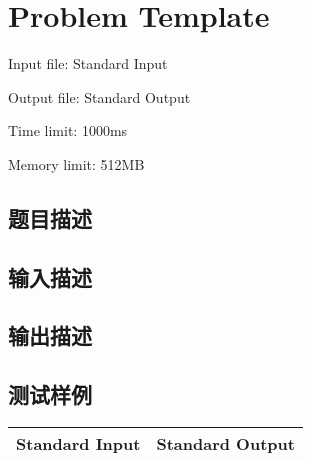 \newpage
\section{Problem Template}
{ \limitfont{}
Input file: Standard Input \par
Output file: Standard Output \par
Time limit: 1000ms \par
Memory limit: 512MB \par
}
\subsection*{题目描述}

\subsection*{输入描述}

\subsection*{输出描述}

\subsection*{测试样例}

\begin{table}[H]
\begin{tabularx}{\textwidth}{|X|X|}
    \hline
    \textbf{Standard Input} & \textbf{Standard Output} \\ 
    \hline
\end{tabularx}
\end{table}